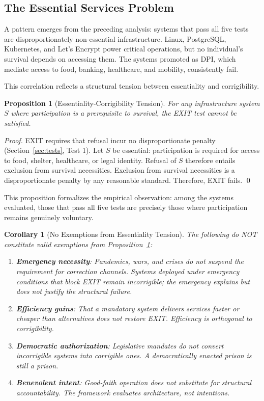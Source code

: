 \documentclass{article}
\newtheorem{proposition}{Proposition}
\newtheorem{corollary}{Corollary}
\begin{document}
\subsection{The Essential Services Problem}
\label{subsec:essential}

A pattern emerges from the preceding analysis: systems that pass all five tests are disproportionately non-essential infrastructure. Linux, PostgreSQL, Kubernetes, and Let's Encrypt power critical operations, but no individual's survival depends on accessing them. The systems promoted as DPI, which mediate access to food, banking, healthcare, and mobility, consistently fail.

This correlation reflects a structural tension between essentiality and corrigibility.

\begin{proposition}[Essentiality-Corrigibility Tension]
\label{prop:essentiality}
For any infrastructure system $S$ where participation is a prerequisite to survival, the EXIT test cannot be satisfied.
\end{proposition}

\begin{proof}
EXIT requires that refusal incur no disproportionate penalty (Section~\ref{sec:tests}, Test 1). Let $S$ be essential: participation is required for access to food, shelter, healthcare, or legal identity. Refusal of $S$ therefore entails exclusion from survival necessities. Exclusion from survival necessities is a disproportionate penalty by any reasonable standard. Therefore, EXIT fails. \qed
\end{proof}

This proposition formalizes the empirical observation: among the systems evaluated, those that pass all five tests are precisely those where participation remains genuinely voluntary.

\begin{corollary}[No Exemptions from Essentiality Tension]
The following do NOT constitute valid exemptions from Proposition~\ref{prop:essentiality}:
\begin{enumerate}[noitemsep]
    \item \textbf{Emergency necessity}: Pandemics, wars, and crises do not suspend the requirement for correction channels. Systems deployed under emergency conditions that block EXIT remain incorrigible; the emergency explains but does not justify the structural failure.
    \item \textbf{Efficiency gains}: That a mandatory system delivers services faster or cheaper than alternatives does not restore EXIT. Efficiency is orthogonal to corrigibility.
    \item \textbf{Democratic authorization}: Legislative mandates do not convert incorrigible systems into corrigible ones. A democratically enacted prison is still a prison.
    \item \textbf{Benevolent intent}: Good-faith operation does not substitute for structural accountability. The framework evaluates architecture, not intentions.
\end{enumerate}
\end{corollary}
\end{document}
